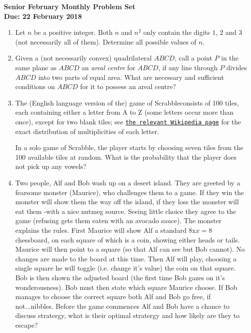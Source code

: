 \documentclass{article}
\begin{document}
\begin{center}
\textbf{\Large Senior February Monthly Problem Set}
\\ \vspace{1em}
\textbf{\large Due: 22 February 2018}
\end{center}

\begin{enumerate}[1.]

\item %
Let $n$ be a positive integer. Both $n$ and $n^2$ only contain the digits $1$, $2$ and $3$ (not necessarily all of them). Determine all possible values of $n$.


\vspace{6pt}
\item %
Given a (not necessarily convex) quadrilateral $ABCD$, call a point $P$ in the same plane as $ABCD$ an \emph{areal centre} for $ABCD$, if any line through $P$ divides $ABCD$ into two parts of equal area. What are necessary and sufficient conditions on $ABCD$ for it to possess an areal centre?


\vspace{6pt}
\item %
The (English language version of the) game of Scrabble\texttrademark consists of 100 tiles, each containing either a letter from A to Z (some letters occur more than once), except for two blank tiles; see \href{https://en.wikipedia.org/wiki/Scrabble_letter_distributions#English}{\texttt{the relevant Wikipedia page}} for the exact distribution of multiplicities of each letter.

In a solo game of Scrabble, the player starts by choosing seven tiles from the 100 available tiles at random. What is the probability that the player does not pick up any vowels?


\vspace{6pt}
\item %
Two people, Alf and Bob wash up on a desert island. They are greeted by a fearsome monster (Maurice), who challenges them to a game. If they win the monster will show them the way off the island, if they loss the monster will eat them -with a nice nutmeg source. Seeing little choice they agree to the game (refusing gets them eaten with an avocado sauce). The monster explains the rules.  First Maurice will show Alf a standard $8$x$x=8$ chessboard, on each square of which is a coin, showing either heads or tails. Maurice will then point to a square (so that Alf can see but Bob cannot). No changes are made to the board at this time. Then Alf will play, choosing a single square he will toggle (i.e. change it's value) the coin on that square. Bob is then shown the adjusted board (the first time Bob gazes on it's wonderousness). Bob must then state which square Maurice choose. If Bob manages to choose the correct square both Alf and Bob go free, if not...nibbles. Before the game commences Alf and Bob have a chance to discuss stratergy, what is their optimal stratergy and how likely are they to escape? 



\end{enumerate}
\end{document}
